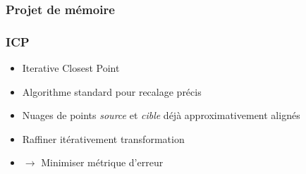 \documentclass{beamer}
\begin{document}
\begin{frame}
\frametitle{Projet de mémoire}
	\begin{itemize}
	
	\end{itemize}
\end{frame}

\begin{frame}
\frametitle{ICP}
	\begin{itemize}
	\item Iterative Closest Point
	\item Algorithme standard pour recalage précis
	\item Nuages de points \emph{source} et \emph{cible} déjà approximativement alignés
	\item Raffiner itérativement transformation
	\item $\rightarrow$ Minimiser métrique d'erreur
	\end{itemize}
\end{frame}




\end{document}
